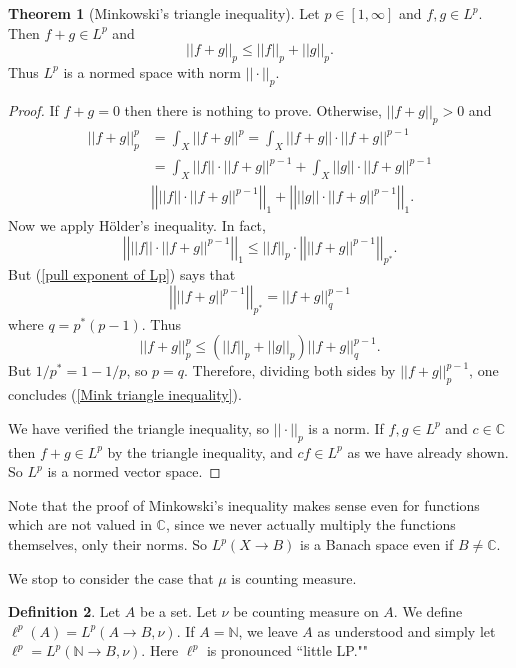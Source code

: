\documentclass[12pt]{book}
\newcommand{\NN}{\mathbb{N}}
\newcommand{\CC}{\mathbb{C}}
\theoremstyle{definition}
\newtheorem{theorem}{Theorem}[section]
\newtheorem{definition}[theorem]{Definition}
\begin{document}
\begin{theorem}[Minkowski's triangle inequality]
Let $p \in [1, \infty]$ and $f, g \in L^p$. Then $f + g \in L^p$ and
\begin{equation}
\label{Mink triangle inequality}
||f + g||_p \leq ||f||_p + ||g||_p.
\end{equation}
Thus $L^p$ is a normed space with norm $||\cdot||_p$.
\end{theorem}
\begin{proof}
If $f + g = 0$ then there is nothing to prove.
Otherwise, $||f + g||_p > 0$ and
\begin{align*}
||f + g||_p^p &= \int_X ||f + g||^p = \int_X ||f + g||\cdot ||f + g||^{p-1} \\
&= \int_X ||f||\cdot ||f + g||^{p-1} + \int_X ||g||\cdot ||f + g||^{p-1}\\
&\left|\left|||f||\cdot ||f + g||^{p-1}\right|\right|_1 + \left|\left|||g||\cdot ||f + g||^{p-1}\right|\right|_1.
\end{align*}
Now we apply H\"older's inequality. In fact,
$$\left|\left|||f||\cdot ||f + g||^{p-1}\right|\right|_1 \leq ||f||_p \cdot \left|\left|||f + g||^{p-1}\right|\right|_{p^*}.$$
But (\ref{pull exponent of Lp}) says that
$$\left|\left|||f + g||^{p-1}\right|\right|_{p^*} = ||f + g||_q^{p - 1}$$
where $q = p^*(p-1)$. Thus
$$||f + g||_p^p \leq (||f||_p + ||g||_p) ||f + g||_q^{p - 1}.$$
But $1/p^* = 1 - 1/p$, so $p = q$. Therefore, dividing both sides by $||f + g||_p^{p - 1}$, one concludes (\ref{Mink triangle inequality}).

We have verified the triangle inequality, so $||\cdot||_p$ is a norm. If $f, g \in L^p$ and $c \in \CC$ then $f + g \in L^p$ by the triangle inequality, and $cf \in L^p$ as we have already shown.
So $L^p$ is a normed vector space.
\end{proof}
Note that the proof of Minkowski's inequality makes sense even for functions which are not valued in $\CC$, since we never actually multiply the functions themselves, only their norms. So $L^p(X \to B)$ is a Banach space even if $B \neq \CC$.

We stop to consider the case that $\mu$ is counting measure.

\begin{definition}
Let $A$ be a set. Let $\nu$ be counting measure on $A$. We define $\ell^p(A) = L^p(A \to B, \nu)$.
If $A = \NN$, we leave $A$ as understood and simply let $\ell^p = L^p(\NN \to B, \nu)$.
Here $\ell^p$ is pronounced ``little LP.""
\end{definition}
\end{document}
